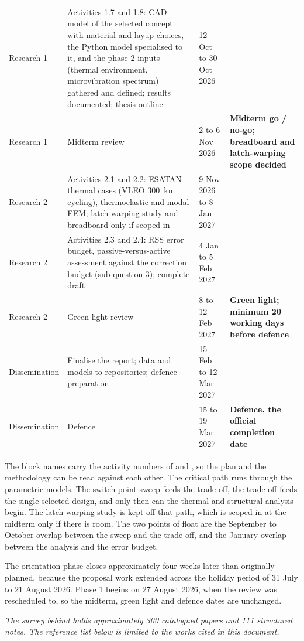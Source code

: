 {\begin{longtable}{p{1.9cm}p{6.0cm}p{2.5cm}p{3.4cm}}
        Research 1 & Activities 1.7 and 1.8: CAD model of the selected concept with material and layup choices, the Python model specialised to it, and the phase-2 inputs (thermal environment, microvibration spectrum) gathered and defined; results documented; thesis outline & 12 Oct to 30 Oct 2026 & \\
        Research 1 & Midterm review & 2 to 6 Nov 2026 & \textbf{Midterm go / no-go; breadboard and latch-warping scope decided} \\
        Research 2 & Activities 2.1 and 2.2: ESATAN thermal cases (VLEO \SI{300}{\kilo\meter} cycling), thermoelastic and modal FEM; latch-warping study and breadboard only if scoped in & 9 Nov 2026 to 8 Jan 2027 & \\
        Research 2 & Activities 2.3 and 2.4: RSS error budget, passive-versus-active assessment against the correction budget (sub-question 3); complete draft & 4 Jan to 5 Feb 2027 & \\
        Research 2 & Green light review & 8 to 12 Feb 2027 & \textbf{Green light; minimum 20 working days before defence} \\
        Dissemination & Finalise the report; data and models to repositories; defence preparation & 15 Feb to 12 Mar 2027 & \\
        Dissemination & Defence & 15 to 19 Mar 2027 & \textbf{Defence, the official completion date} \\
        \bottomrule
\end{longtable}
}

The block names carry the activity numbers of  and , so the plan and the methodology can be read against each other. The critical path runs through the parametric models. The switch-point sweep feeds the trade-off, the trade-off feeds the single selected design, and only then can the thermal and structural analysis begin. The latch-warping study is kept off that path, which is scoped in at the midterm only if there is room. The two points of float are the September to October overlap between the sweep and the trade-off, and the January overlap between the analysis and the error budget.

The orientation phase closes approximately four weeks later than originally planned, because the proposal work extended across the holiday period of 31 July to 21 August 2026. Phase 1 begins on 27 August 2026, when the review was rescheduled to, so the midterm, green light and defence dates are unchanged.

\bigskip

\noindent \emph{The survey behind  holds approximately 300 catalogued papers and 111 structured notes. The reference list below is limited to the works cited in this document.}
